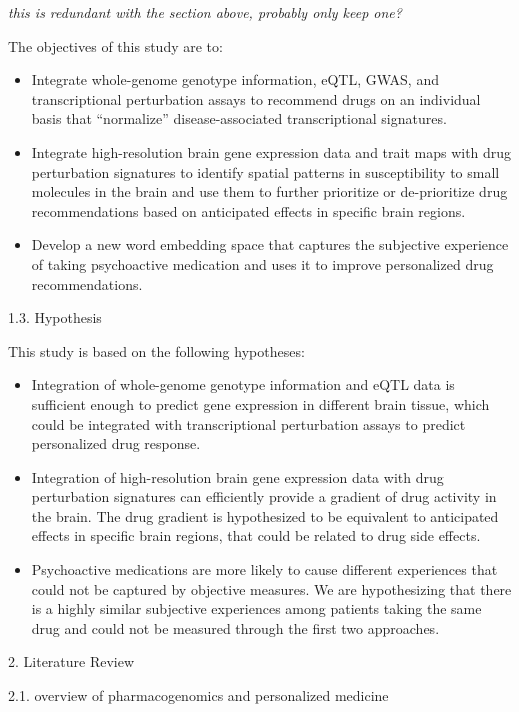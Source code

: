 \documentclass[
]{article}
\providecommand{\tightlist}{%
  \setlength{\itemsep}{0pt}\setlength{\parskip}{0pt}}
\begin{document}
\emph{this is redundant with the section above, probably only keep one?}

The objectives of this study are to:

\begin{itemize}
\tightlist
\item
  Integrate whole-genome genotype information, eQTL, GWAS, and
  transcriptional perturbation assays to recommend drugs on an
  individual basis that ``normalize'' disease-associated transcriptional
  signatures.
\item
  Integrate high-resolution brain gene expression data and trait maps
  with drug perturbation signatures to identify spatial patterns in
  susceptibility to small molecules in the brain and use them to further
  prioritize or de-prioritize drug recommendations based on anticipated
  effects in specific brain regions.
\item
  Develop a new word embedding space that captures the subjective
  experience of taking psychoactive medication and uses it to improve
  personalized drug recommendations.
\end{itemize}

1.3. Hypothesis

This study is based on the following hypotheses:

\begin{itemize}
\tightlist
\item
  Integration of whole-genome genotype information and eQTL data is
  sufficient enough to predict gene expression in different brain
  tissue, which could be integrated with transcriptional perturbation
  assays to predict personalized drug response.
\item
  Integration of high-resolution brain gene expression data with drug
  perturbation signatures can efficiently provide a gradient of drug
  activity in the brain. The drug gradient is hypothesized to be
  equivalent to anticipated effects in specific brain regions, that
  could be related to drug side effects.
\item
  Psychoactive medications are more likely to cause different
  experiences that could not be captured by objective measures. We are
  hypothesizing that there is a highly similar subjective experiences
  among patients taking the same drug and could not be measured through
  the first two approaches.
\end{itemize}

2. Literature Review

2.1. overview of pharmacogenomics and personalized medicine
\end{document}
